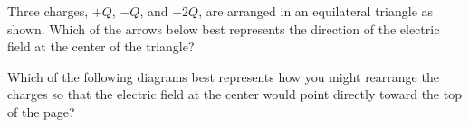 \documentclass{../../../oss-ap12ibhl-print}
\begin{document}
\begin{questions}
  \question Three charges, $+Q$, $-Q$, and $+2Q$, are arranged in an
  equilateral triangle as shown. Which of the arrows below best represents the
  direction of the electric field at the center of the triangle?

  \begin{minipage}{.3\linewidth}
  \end{minipage}
  \begin{minipage}{.6\linewidth}
    \begin{oneparchoices}
      \choice {\huge$\downarrow$}
      \choice {\huge$\uparrow$}
      \choice {\huge$\searrow$}
      \choice {\huge$\swarrow$}
      \choice {\huge$\nearrow$}
    \end{oneparchoices}
  \end{minipage}
  
  \question Which of the following diagrams best represents how you might
  rearrange the charges so that the electric field at the center would point
  directly toward the top of the page?


\end{questions}
\end{document}
